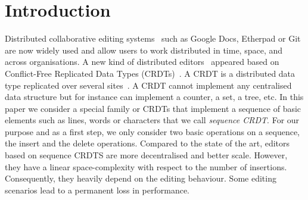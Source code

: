\section{Introduction}


Distributed collaborative editing
systems~\cite{Ellis:1989:CCG:67544.66963,ellis1991groupware,greenberg1994real}
such as Google Docs, Etherpad or Git are now widely used and allow users to
work distributed in time, space, and across organisations. A new kind of
distributed editors~\cite{preguica2009commutative,weiss2007wooki} appeared
based on Conflict-Free Replicated Data Types
(CRDTs)~\cite{oster2006data,weiss2009logoot,shapiro2011conflict}. A CRDT is a
distributed data type replicated over several
sites~\cite{saito2005optimistic,saito2002replication}. A CRDT cannot implement
any centralised data structure but for instance can implement a counter, a set,
a tree, etc. In this paper we consider a special family or CRDTs that implement
a sequence of basic elements such as lines, words or characters that we call
\emph{sequence CRDT}. For our purpose and as a first step, we only consider two
basic operations on a sequence, the insert and the delete operations. Compared
to the state of the art, editors based on sequence CRDTS are more decentralised
and better scale. However, they have a linear space-complexity with respect to
the number of insertions. Consequently, they heavily depend on the editing
behaviour. Some editing scenarios lead to a permanent loss in performance.

